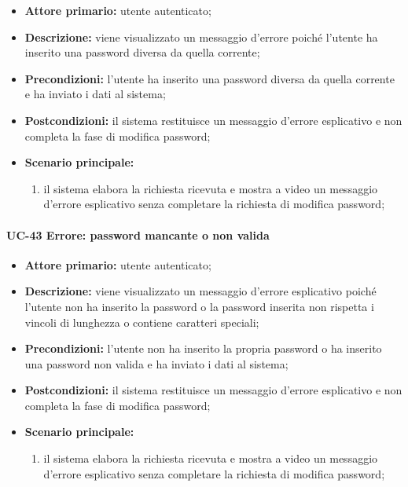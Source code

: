 	\begin{itemize}
		\item \textbf{Attore primario:} utente autenticato;

		\item \textbf{Descrizione:}  viene visualizzato un messaggio d'errore poiché l'utente ha inserito una password diversa da quella corrente;

		\item \textbf{Precondizioni:} l'utente ha inserito una password diversa da quella corrente e ha inviato i dati al sistema;

		\item \textbf{Postcondizioni:} il sistema restituisce un messaggio d'errore esplicativo e non completa la fase di modifica password;

		\item \textbf{Scenario principale:}
	  		\begin{enumerate}
		  		\item il sistema elabora la richiesta ricevuta e mostra a video un messaggio d'errore esplicativo senza completare la richiesta di modifica password; 
	  		\end{enumerate}
	\end{itemize}

\paragraph{UC-43 Errore: password mancante o non valida}


	\begin{itemize}
		\item \textbf{Attore primario:} utente autenticato;

		\item \textbf{Descrizione:} viene visualizzato un messaggio d'errore esplicativo poiché l'utente non ha inserito la password o la password inserita non rispetta i vincoli di lunghezza o contiene caratteri speciali;

		\item \textbf{Precondizioni:} l'utente non ha inserito la propria password o ha inserito una password non valida e ha inviato i dati al sistema;

		\item \textbf{Postcondizioni:} il sistema restituisce un messaggio d'errore esplicativo e non completa la fase di modifica password;

		\item \textbf{Scenario principale:}
	  		\begin{enumerate}
		  		\item il sistema elabora la richiesta ricevuta e mostra a video un messaggio d'errore esplicativo senza completare la richiesta di modifica password; 
	  		\end{enumerate}
	\end{itemize}


